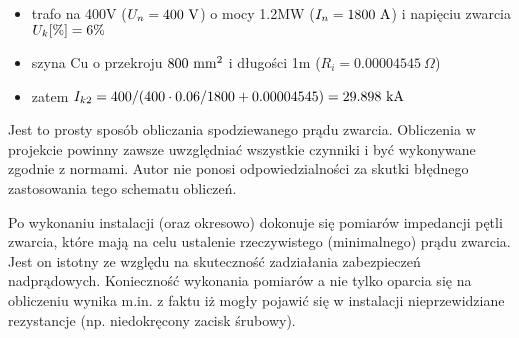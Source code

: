 \noindent{}
\begin{itemize}
	\item trafo na 400V ($U_n=400{\rm ~V}$) o mocy 1.2MW ($I_n=1800{\rm ~A}$) i napięciu zwarcia $U_k{\rm [\%]}=6\%$
	\item szyna Cu o przekroju $800{\rm ~mm^2}$ i długości 1m ($R_i = 0.00004545~\Omega$)
	\item zatem $I_{k2} = 400 / (400 \cdot 0.06/1800 + 0.00004545) = 29.898{\rm ~kA}$
\end{itemize}
\vspace{8pt}

Jest to prosty sposób obliczania spodziewanego prądu zwarcia.
Obliczenia w projekcie powinny zawsze uwzględniać wszystkie czynniki i być wykonywane zgodnie z normami.
Autor nie ponosi odpowiedzialności za skutki błędnego zastosowania tego schematu obliczeń.

Po wykonaniu instalacji (oraz okresowo) dokonuje się pomiarów impedancji pętli zwarcia, które mają na celu ustalenie rzeczywistego (minimalnego) prądu zwarcia.
Jest on istotny ze względu na skuteczność zadziałania zabezpieczeń nadprądowych.
Konieczność wykonania pomiarów a nie tylko oparcia się na obliczeniu wynika m.in. z faktu iż mogły pojawić się w instalacji nieprzewidziane rezystancje (np. niedokręcony zacisk śrubowy).
